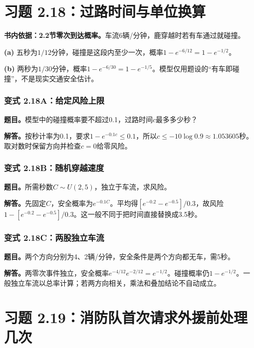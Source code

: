 \documentclass[12pt,a4paper,UTF8,fontset=fandol]{ctexart}
\begin{document}
\section{习题
2.18：过路时间与单位换算}\label{ux4e60ux9898-2.18ux8fc7ux8defux65f6ux95f4ux4e0eux5355ux4f4dux6362ux7b97}

\textbf{书内依据：2.2节零次到达概率。}车流6辆/分钟，鹿穿越时若有车通过就碰撞。

\textbf{(a)}
五秒为\(1/12\)分钟，碰撞是这段内至少一次，概率\(\boxed{1-e^{-6/12}=1-e^{-1/2}}\)。

\textbf{(b)}
两秒为\(1/30\)分钟，概率\(\boxed{1-e^{-6/30}=1-e^{-1/5}}\)。模型仅用题设的``有车即碰撞''，不是现实交通安全估计。

\subsubsection{变式
2.18A：给定风险上限}\label{ux53d8ux5f0f-2.18aux7ed9ux5b9aux98ceux9669ux4e0aux9650}

\textbf{题目。}模型中的碰撞概率要不超过0.1，过路时间\(c\)最多多少秒？

\textbf{解答。}按秒计率为0.1，要求\(1-e^{-0.1c}\le0.1\)，所以\(c\le-10\log0.9\approx1.053605\)秒。取对数时保留方向并检查\(c=0\)给零风险。

\subsubsection{变式
2.18B：随机穿越速度}\label{ux53d8ux5f0f-2.18bux968fux673aux7a7fux8d8aux901fux5ea6}

\textbf{题目。}所需秒数\(C\sim U(2,5)\)，独立于车流，求风险。

\textbf{解答。}先固定\(C\)，安全概率为\(e^{-0.1C}\)。平均得\([e^{-0.2}-e^{-0.5}]/0.3\)，故风险\(1-[e^{-0.2}-e^{-0.5}]/0.3\)。这一般不同于把时间直接替换成3.5秒。

\subsubsection{变式
2.18C：两股独立车流}\label{ux53d8ux5f0f-2.18cux4e24ux80a1ux72ecux7acbux8f66ux6d41}

\textbf{题目。}两个方向分别为4、2辆/分钟，安全条件是两个方向都无车，需5秒。

\textbf{解答。}两零次事件独立，安全概率\(e^{-4/12}e^{-2/12}=e^{-1/2}\)。碰撞概率仍\(1-e^{-1/2}\)。一般独立车流以总率计算；若两方向相关，乘法和叠加结论不自动成立。

\section{习题
2.19：消防队首次请求外援前处理几次}\label{ux4e60ux9898-2.19ux6d88ux9632ux961fux9996ux6b21ux8bf7ux6c42ux5916ux63f4ux524dux5904ux7406ux51e0ux6b21}
\end{document}
